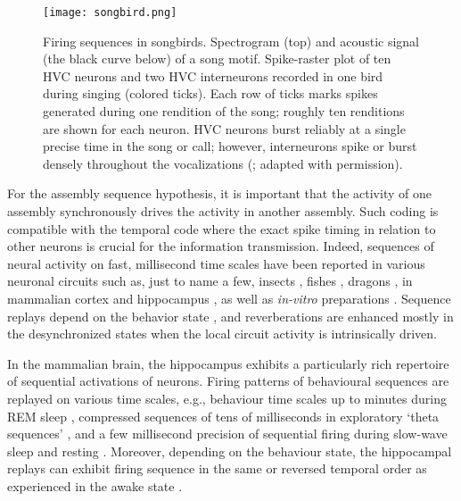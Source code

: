     \begin{figure}
      \center
      \texttt{[image: songbird.png]}
      \caption{Firing sequences in songbirds. Spectrogram (top) and acoustic
        signal (the black curve below) of a song motif. Spike-raster plot of
        ten HVC neurons and two HVC interneurons recorded in one bird during
        singing (colored ticks). Each row of ticks marks spikes generated
        during one rendition of the song; roughly ten renditions are shown for
        each neuron. HVC neurons burst reliably at a single precise time in the
        song or call; however, interneurons spike or burst densely throughout
        the vocalizations (\citealp{Hahnloser2002}; adapted with permission).
             }
    \label{fig:songbird}
    \end{figure}

    For the assembly sequence hypothesis, it is important that the activity of
    one assembly synchronously drives the activity in another assembly. Such
    coding is compatible with the temporal code where the exact spike timing in
    relation to other neurons is crucial for the information transmission.
    Indeed, sequences of neural activity on fast, millisecond time scales have
    been reported in various neuronal circuits such as, just to name a few,
    insects \citep{Fushiki2016}, fishes \citep{Romano2015}, dragons
    \citep{Shein2016}, in mammalian cortex \citep{Euston2007} and hippocampus
    \citep{Lee2002}, as well as {\it in-vitro} preparations \citep{Mao2001,
    Segev2004, MacLean2005, Kruskal2013}. Sequence replays depend on the
    behavior state \citep{Almeida2014}, and reverberations are enhanced mostly
    in the desynchronized states \citep{Contreras2013, Buzsaki1983} when the
    local circuit activity is intrinsically driven. 

    In the mammalian brain, the hippocampus exhibits a particularly rich
    repertoire of sequential activations of neurons. Firing patterns of
    behavioural sequences are replayed on various time scales, e.g., behaviour
    time scales up to minutes during REM sleep \citep{Louie2001}, compressed
    sequences of tens of milliseconds in exploratory `theta sequences'
    \citep{Skaggs1996, Dragoi2006, Gupta2012, Feng2015}, and a few millisecond
    precision of sequential firing during slow-wave sleep and resting
    \citep{Lee2002}. Moreover, depending on the behaviour state, the
    hippocampal replays can exhibit firing sequence in the same or reversed
    temporal order as experienced in the awake state \citep{Foster2006}.

